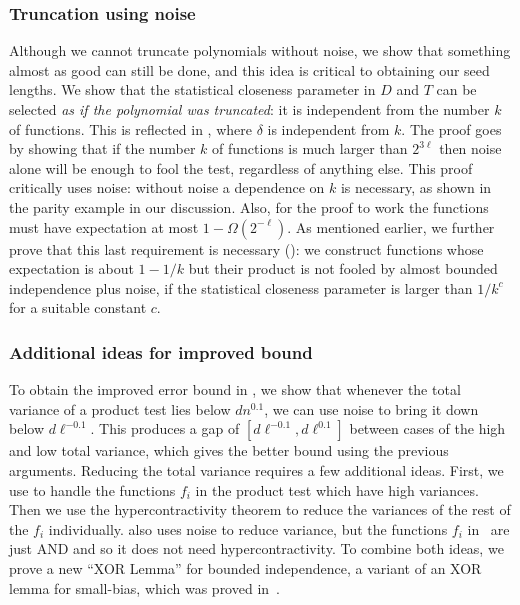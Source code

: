 \documentclass{toc}
\def\Blocklength{\ell}
\begin{document}
\subsubsection{Truncation using noise}  %
%
Although we cannot truncate polynomials without noise, we show that something almost as good can still be done, and this idea is critical to obtaining our seed lengths.
We show that the statistical closeness parameter in $D$ and $T$
can be selected \emph{as if the polynomial was truncated}: it is
independent from the number $k$ of functions.
This is reflected in , where $\delta$ is independent from $k$.
The proof goes by showing that if the number $k$ of functions is much
larger than $2^{3\Blocklength}$ then noise alone will be enough to fool the test, regardless of
anything else.
This proof critically uses noise: without noise a dependence on $k$ is necessary, as shown in the parity example in our discussion.
Also, for the proof to work the functions must have expectation at most $1 - \Omega(2^{-\Blocklength})$.
As mentioned earlier, we further prove that this last requirement is necessary
(): we construct functions whose
expectation is about $1 - 1/k$ but their product is not fooled by almost
bounded independence plus noise, if the statistical closeness parameter is
larger than $1/k^c$ for a suitable constant $c$.

%
\subsubsection{Additional ideas for improved bound}   %
To obtain the improved error bound in , we show that whenever the total variance of a product test lies below $dn^{0.1}$, we can use noise to bring it down below $d\Blocklength^{-0.1}$.
This produces a gap of $[d\Blocklength^{-0.1}, d\Blocklength^{0.1}]$ between cases of the high and low total variance, which gives the better bound using the previous arguments.
Reducing the total variance requires a few additional ideas.
First, we use  to handle the functions $f_i$ in the product test which have high variances.
Then we use the hypercontractivity theorem to reduce the variances of the rest of the $f_i$ individually.
\cite{GopalanMRTV12} also uses noise to reduce variance, but the functions $f_i$ in~\cite{GopalanMRTV12} are just AND and so it does not need hypercontractivity.
To combine both ideas, we prove a new ``XOR Lemma'' for bounded independence, a variant of an XOR lemma for small-bias, which was proved in~\cite{GopalanMRTV12}.
\end{document}
